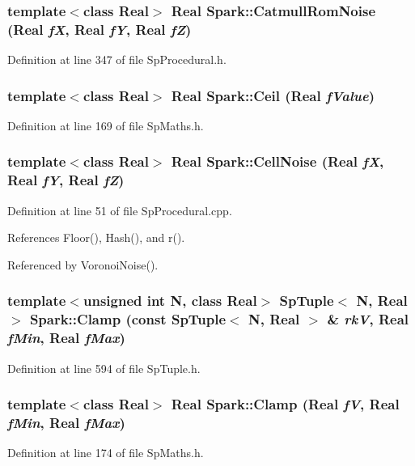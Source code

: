 \subsubsection{\setlength{\rightskip}{0pt plus 5cm}template$<$class Real$>$ Real Spark::Catmull\-Rom\-Noise (Real {\em f\-X}, Real {\em f\-Y}, Real {\em f\-Z})}\label{namespaceSpark_a107}


Definition at line 347 of file Sp\-Procedural.h.
\subsubsection{\setlength{\rightskip}{0pt plus 5cm}template$<$class Real$>$ Real Spark::Ceil (Real {\em f\-Value})}\label{namespaceSpark_a41}


Definition at line 169 of file Sp\-Maths.h.
\subsubsection{\setlength{\rightskip}{0pt plus 5cm}template$<$class Real$>$ Real Spark::Cell\-Noise (Real {\em f\-X}, Real {\em f\-Y}, Real {\em f\-Z})}\label{namespaceSpark_a73}


Definition at line 51 of file Sp\-Procedural.cpp.

References Floor(), Hash(), and r().

Referenced by Voronoi\-Noise().
\subsubsection{\setlength{\rightskip}{0pt plus 5cm}template$<$unsigned int N, class Real$>$ {\bf Sp\-Tuple}$<$ N, Real $>$ Spark::Clamp (const Sp\-Tuple$<$ N, Real $>$ \& {\em rk\-V}, Real {\em f\-Min}, Real {\em f\-Max})}\label{namespaceSpark_a123}


Definition at line 594 of file Sp\-Tuple.h.
\subsubsection{\setlength{\rightskip}{0pt plus 5cm}template$<$class Real$>$ Real Spark::Clamp (Real {\em f\-V}, Real {\em f\-Min}, Real {\em f\-Max})}\label{namespaceSpark_a42}


Definition at line 174 of file Sp\-Maths.h.

